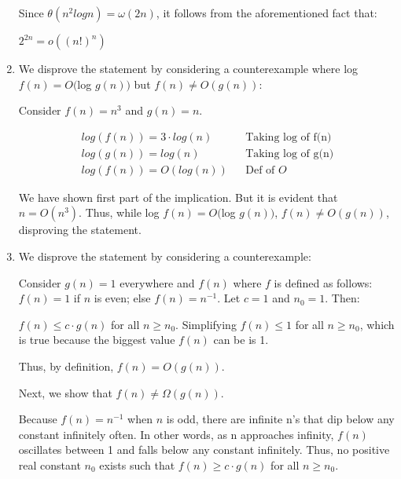 \documentclass[a4paper]{report}
\begin{document}
\begin{enumerate}
      Since $\theta(n^2 log n) = \omega(2n)$, it follows from the aforementioned fact that:

      $2^{2n} = o((n!)^{n})$

    \pagebreak
    \bigskip
    \setcounter{equation}{0}
    \item We disprove the statement by considering a counterexample where log $f(n) = O($log $g(n))$ but $f(n) \neq O(g(n))$: 
    
      Consider $f(n) = n^3$ and $g(n) = n$. 

      \begin{align}
        log(f(n)) = 3 \cdot log(n)                    &&\text{Taking log of f(n)}\\
        log(g(n)) = log(n)                            &&\text{Taking log of g(n)}\\
        log(f(n)) = O(log(n))                         &&\text{Def of $O$}
      \end{align}

      We have shown first part of the implication. But it is evident that $n = O(n^3)$.
      Thus, while log $f(n) = O($log $g(n))$, $f(n) \neq O(g(n))$, disproving the statement.

    \bigskip
    \setcounter{equation}{0}
    \item We disprove the statement by considering a counterexample: 

      Consider $g(n) = 1$ everywhere and $f(n)$ where $f$ is defined as follows: $f(n) = 1$ if $n$ is even; else $f(n) = n^{-1}$.
      Let $c = 1$ and $n_{0} = 1$. Then:

      $f(n) \leq c \cdot g(n)$ for all $n \geq n_{0}$.
      Simplifying $f(n) \leq 1$ for all $n \geq n_{0}$, which is true because the biggest value $f(n)$ can be is 1.

      Thus, by definition, $f(n) = O(g(n))$.

      Next, we show that $f(n) \neq \Omega(g(n))$.

      Because $f(n) = n^{-1}$ when $n$ is odd, there are infinite n's that dip below any constant infinitely often.
      In other words, as n approaches infinity, $f(n)$ oscillates between 1 and falls below any constant infinitely. 
      Thus, no positive real constant $n_{0}$ exists such that $f(n) \geq c \cdot g(n)$ for all $n \geq n_{0}$.


\end{enumerate}
\end{document}
